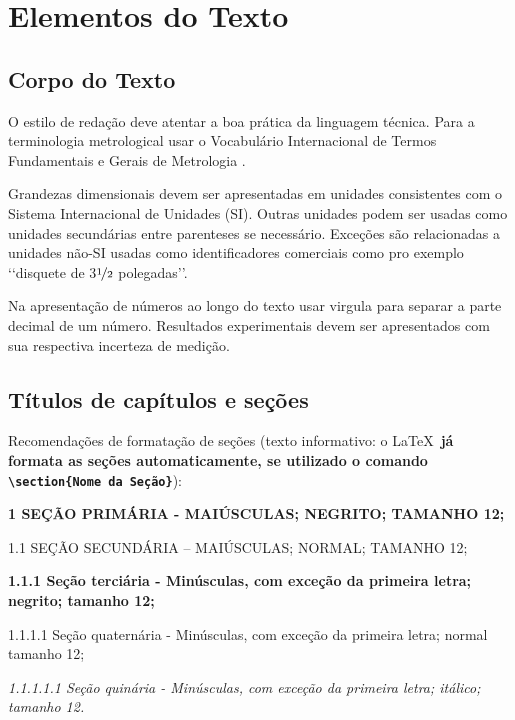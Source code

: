 \chapter[Elementos do Texto]{Elementos do Texto}

\section{Corpo do Texto}

O estilo de redação deve atentar a boa prática da linguagem técnica. Para a 
terminologia metrological usar o Vocabulário Internacional de Termos 
Fundamentais e Gerais de Metrologia \cite{inmetro2003}.

Grandezas dimensionais devem ser apresentadas em unidades consistentes com 
o Sistema Internacional de Unidades  (SI). Outras unidades podem ser usadas 
como unidades secundárias entre parenteses se necessário. Exceções são 
relacionadas a unidades não-SI usadas como identificadores comerciais como 
pro exemplo \lq\lq disquete de  3$\nicefrac{1}{2}$ polegadas\rq\rq. 

Na apresentação de números ao longo do texto usar virgula para separar a 
parte decimal de um número. Resultados experimentais devem ser apresentados 
com sua respectiva incerteza de medição.

\section{Títulos de capítulos e seções}

Recomendações de formatação de seções (texto informativo: o \LaTeX\
\textbf{já formata as seções automaticamente, se utilizado o comando
\texttt{\textbackslash section\{Nome da Seção\}}}):

\begin{description}

	\item \textbf{1 SEÇÃO PRIMÁRIA - MAIÚSCULAS; NEGRITO; TAMANHO 12;}

	\item 1.1 SEÇÃO SECUNDÁRIA – MAIÚSCULAS; NORMAL; TAMANHO 12; 

	\item \textbf{1.1.1 Seção terciária - Minúsculas, com exceção da 
	primeira letra; negrito; tamanho 12;}

	\item 1.1.1.1 Seção quaternária - Minúsculas, com exceção da primeira 
	letra; normal tamanho 12; 

 	\item \textit{1.1.1.1.1 Seção quinária - Minúsculas, com exceção da 
	primeira letra; itálico; tamanho 12.}

\end{description}

